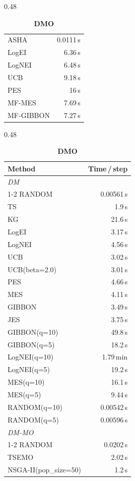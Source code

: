 \begin{table}[h]
\begin{subtable}[t]{0.48\textwidth}
\begin{tabular}{lr}
      ASHA & 0.0111\,s \\
      LogEI & 6.36\,s \\
      LogNEI & 6.48\,s \\
      UCB & 9.18\,s \\
      PES & 16\,s \\
      MF-MES & 7.69\,s \\
      MF-GIBBON & 7.27\,s \\
      \bottomrule
    \end{tabular}
  \end{subtable}
  \hfill
  \begin{subtable}[t]{0.48\textwidth}
    \centering
    \footnotesize
    \caption{\textbf{DMO}}
    \begin{tabular}{lr}
      \toprule
      \textbf{Method} & \textbf{Time\,/\,step} \\
      \midrule
      \multicolumn{2}{l}{\textit{DM}} \\
      \cmidrule{1-2}
      RANDOM & 0.00561\,s \\
      TS & 1.9\,s \\
      KG & 21.6\,s \\
      LogEI & 3.17\,s \\
      LogNEI & 4.56\,s \\
      UCB & 3.02\,s \\
      UCB(beta=2.0) & 3.01\,s \\
      PES & 4.66\,s \\
      MES & 4.11\,s \\
      GIBBON & 3.49\,s \\
      JES & 3.75\,s \\
      GIBBON(q=10) & 49.8\,s \\
      GIBBON(q=5) & 18.2\,s \\
      LogNEI(q=10) & 1.79\,min \\
      LogNEI(q=5) & 19.2\,s \\
      MES(q=10) & 16.1\,s \\
      MES(q=5) & 9.44\,s \\
      RANDOM(q=10) & 0.00542\,s \\
      RANDOM(q=5) & 0.00596\,s \\
      \midrule
      \multicolumn{2}{l}{\textit{DM-MO}} \\
      \cmidrule{1-2}
      RANDOM & 0.0202\,s \\
      TSEMO & 2.02\,s \\
      NSGA-II(pop\_size=50) & 1.2\,s \\

\end{tabular}
\end{subtable}
\end{table}
